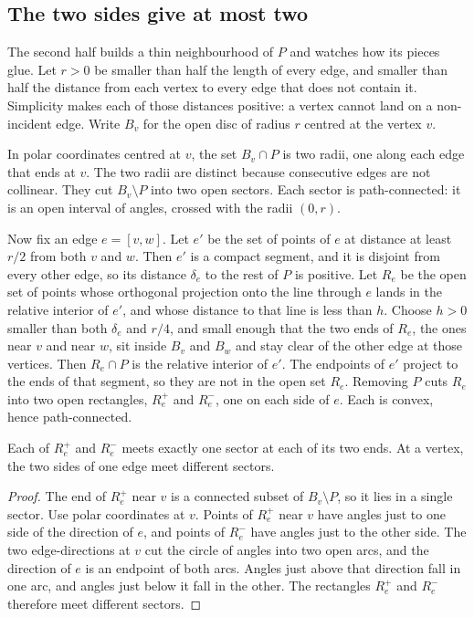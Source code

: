 \subsection*{The two sides give at most two}

The second half builds a thin neighbourhood of $P$ and watches how its pieces glue. Let $r>0$ be smaller than half the length of every edge, and smaller than half the distance from each vertex to every edge that does not contain it. Simplicity makes each of those distances positive: a vertex cannot land on a non-incident edge. Write $B_v$ for the open disc of radius $r$ centred at the vertex $v$.

In polar coordinates centred at $v$, the set $B_v\cap P$ is two radii, one along each edge that ends at $v$. The two radii are distinct because consecutive edges are not collinear. They cut $B_v\setminus P$ into two open sectors. Each sector is path-connected: it is an open interval of angles, crossed with the radii $(0,r)$.

Now fix an edge $e=[v,w]$. Let $e'$ be the set of points of $e$ at distance at least $r/2$ from both $v$ and $w$. Then $e'$ is a compact segment, and it is disjoint from every other edge, so its distance $\delta_e$ to the rest of $P$ is positive. Let $R_e$ be the open set of points whose orthogonal projection onto the line through $e$ lands in the relative interior of $e'$, and whose distance to that line is less than $h$. Choose $h>0$ smaller than both $\delta_e$ and $r/4$, and small enough that the two ends of $R_e$, the ones near $v$ and near $w$, sit inside $B_v$ and $B_w$ and stay clear of the other edge at those vertices. Then $R_e\cap P$ is the relative interior of $e'$. The endpoints of $e'$ project to the ends of that segment, so they are not in the open set $R_e$. Removing $P$ cuts $R_e$ into two open rectangles, $R_e^+$ and $R_e^-$, one on each side of $e$. Each is convex, hence path-connected.

\begin{lemma}\label{lem:sides}
Each of $R_e^+$ and $R_e^-$ meets exactly one sector at each of its two ends. At a vertex, the two sides of one edge meet different sectors.
\end{lemma}

\begin{proof}
The end of $R_e^+$ near $v$ is a connected subset of $B_v\setminus P$, so it lies in a single sector. Use polar coordinates at $v$. Points of $R_e^+$ near $v$ have angles just to one side of the direction of $e$, and points of $R_e^-$ have angles just to the other side. The two edge-directions at $v$ cut the circle of angles into two open arcs, and the direction of $e$ is an endpoint of both arcs. Angles just above that direction fall in one arc, and angles just below it fall in the other. The rectangles $R_e^+$ and $R_e^-$ therefore meet different sectors.
\end{proof}

